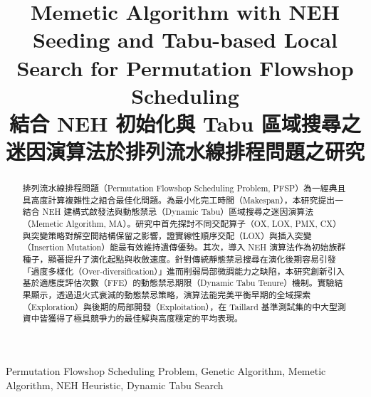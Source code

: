 \documentclass[conference]{IEEEtran}
\begin{document}
\title{Memetic Algorithm with NEH Seeding and Tabu-based Local Search for Permutation Flowshop Scheduling\\
{\large 結合 NEH 初始化與 Tabu 區域搜尋之迷因演算法於排列流水線排程問題之研究}
}


\author{
\and
{}
}



\maketitle

\begin{abstract}
排列流水線排程問題（Permutation Flowshop Scheduling Problem, PFSP）為一經典且具高度計算複雜性之組合最佳化問題。為最小化完工時間（Makespan），本研究提出一結合 NEH 建構式啟發法與動態禁忌（Dynamic Tabu）區域搜尋之迷因演算法（Memetic Algorithm, MA）。研究中首先探討不同交配算子（OX, LOX, PMX, CX）與突變策略對解空間結構保留之影響，證實線性順序交配（LOX）與插入突變（Insertion Mutation）能最有效維持遺傳優勢。其次，導入 NEH 演算法作為初始族群種子，顯著提升了演化起點與收斂速度。針對傳統靜態禁忌搜尋在演化後期容易引發「過度多樣化（Over-diversification）」進而削弱局部微調能力之缺陷，本研究創新引入基於適應度評估次數（FFE）的動態禁忌期限（Dynamic Tabu Tenure）機制。實驗結果顯示，透過退火式衰減的動態禁忌策略，演算法能完美平衡早期的全域探索（Exploration）與後期的局部開發（Exploitation），在 Taillard 基準測試集的中大型測資中皆獲得了極具競爭力的最佳解與高度穩定的平均表現。
\end{abstract}

\begin{IEEEkeywords}
Permutation Flowshop Scheduling Problem, Genetic Algorithm, Memetic Algorithm, NEH Heuristic, Dynamic Tabu Search
\end{IEEEkeywords}
\end{document}
